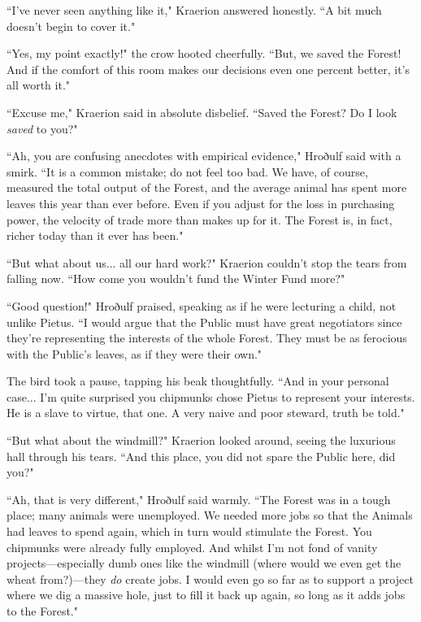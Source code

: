 ``I've never seen anything like it," Kraerion answered honestly.
``A bit much doesn't begin to cover it."

``Yes, my point exactly!" the crow hooted cheerfully.
``But, we saved the Forest!
And if the comfort of this room makes our decisions even one percent better, it's all worth it."

``Excuse me," Kraerion said in absolute disbelief.
``Saved the Forest?
Do I look \textit{saved} to you?"

``Ah, you are confusing anecdotes with empirical evidence," Hroðulf said with a smirk.
``It is a common mistake; do not feel too bad.
We have, of course, measured the total output of the Forest, and the average animal has spent more leaves this year than ever before.
Even if you adjust for the loss in purchasing power, the velocity of trade more than makes up for it.
The Forest is, in fact, richer today than it ever has been."

``But what about us... all our hard work?" Kraerion couldn't stop the tears from falling now.
``How come you wouldn't fund the Winter Fund more?"

``Good question!" Hroðulf praised, speaking as if he were lecturing a child, not unlike Pietus.
``I would argue that the Public must have great negotiators since they're representing the interests of the whole Forest.
They must be as ferocious with the Public's leaves, as if they were their own."

The bird took a pause, tapping his beak thoughtfully.
``And in your personal case... I'm quite surprised you chipmunks chose Pietus to represent your interests.
He is a slave to virtue, that one.
A very naive and poor steward, truth be told."

``But what about the windmill?" Kraerion looked around, seeing the luxurious hall through his tears.
``And this place, you did not spare the Public here, did you?"

``Ah, that is very different," Hroðulf said warmly.
``The Forest was in a tough place; many animals were unemployed.
We needed more jobs so that the Animals had leaves to spend again, which in turn would stimulate the Forest.
You chipmunks were already fully employed.
And whilst I'm not fond of vanity projects---especially dumb ones like the windmill (where would we even get the wheat from?)---they \textit{do} create jobs.
I would even go so far as to support a project where we dig a massive hole, just to fill it back up again, so long as it adds jobs to the Forest."

